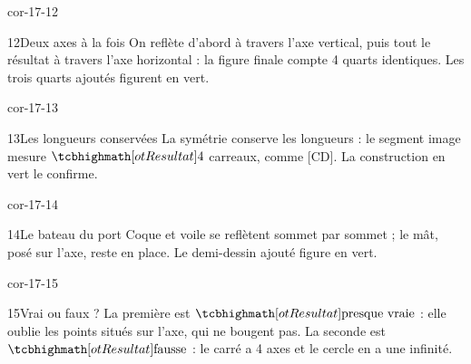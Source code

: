 \begin{blocLivre}{cor-17-12}\begin{corrige}{12}{Deux axes à la fois}
On reflète d’abord à travers l’axe vertical, puis tout le résultat à travers l’axe horizontal : la figure finale compte 4 quarts identiques. Les trois quarts ajoutés figurent en vert.
\label{fig-cor-17-12}
\end{corrige}\end{blocLivre}
\begin{blocLivre}{cor-17-13}\begin{corrige}{13}{Les longueurs conservées}
La symétrie conserve les longueurs : le segment image mesure $\res4$ carreaux, comme [CD]. La construction en vert le confirme.
\label{fig-cor-17-13}
\end{corrige}\end{blocLivre}
\begin{blocLivre}{cor-17-14}\begin{corrige}{14}{Le bateau du port}
Coque et voile se reflètent sommet par sommet ; le mât, posé sur l’axe, reste en place. Le demi-dessin ajouté figure en vert.
\label{fig-cor-17-14}
\end{corrige}\end{blocLivre}
\begin{blocLivre}{cor-17-15}\begin{corrige}{15}{Vrai ou faux ?}
La première est $\res{\text{presque vraie}}$ : elle oublie les points situés sur l’axe, qui ne bougent pas. La seconde est $\res{\text{fausse}}$ : le carré a 4 axes et le cercle en a une infinité.
\label{fig-cor-17-15}
\end{corrige}\end{blocLivre}
